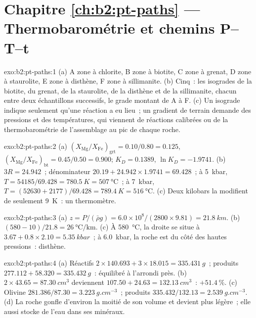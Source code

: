 \section*{Chapitre \ref{ch:b2:pt-paths} --- Thermobarométrie et chemins P--T--t}

\begin{solution}{exo:b2:pt-paths:1}
(a) A zone à chlorite, B zone à biotite, C zone à grenat, D zone à staurolite, E zone à disthène,
F zone à sillimanite. (b) Cinq~: les isogrades de la biotite, du grenat, de la staurolite, de la disthène et de la sillimanite,
chacun entre deux échantillons successifs, le grade montant de A à F. (c) Un isograde
indique seulement qu'une réaction a eu lieu~; un gradient de terrain demande des pressions et des températures, qui
viennent de réactions calibrées ou de la thermobarométrie de l'assemblage au pic de chaque
roche.
\end{solution}

\begin{solution}{exo:b2:pt-paths:2}
(a) $(X_{\text{Mg}}/X_{\text{Fe}})_{\text{grt}} = 0.10/0.80 = 0.125$,
$(X_{\text{Mg}}/X_{\text{Fe}})_{\text{bt}} = 0.45/0.50 = 0.900$; $K_D = 0.1389$, $\ln K_D =
-1.9741$. (b) $3R = 24.942$~; dénominateur $20.19 + 24.942\times1.9741 = 69.428$~; à
\qty{5}{kbar}, $T = 54185/69.428 = \qty{780.5}{K} = \qty{507}{\celsius}$~; à
\qty{7}{kbar}, $T = (52630 + 2177)/69.428 = \qty{789.4}{K} = \qty{516}{\celsius}$.
(c) Deux kilobars la modifient de seulement \qty{9}{K}~: un thermomètre.
\end{solution}

\begin{solution}{exo:b2:pt-paths:3}
(a) $z = P/(\bar\rho g) = 6.0\times10^8/(2800\times9.81) = \qty{21.8}{km}$.
(b) $(580 - 10)/21.8 = \qty{26}{\celsius\per\km}$. (c) À \qty{580}{\celsius}, la droite
se situe à $3.67 + 0.8\times2.10 = \qty{5.35}{kbar}$~; à \qty{6.0}{kbar}, la roche est du côté
des hautes pressions~: disthène.
\end{solution}

\begin{solution}{exo:b2:pt-paths:4}
(a) Réactifs $2\times140.693 + 3\times18.015 = \qty{335.431}{g}$~; produits $277.112 +
58.320 = \qty{335.432}{g}$~: équilibré à l'arrondi près. (b) $2\times43.65 =
\qty{87.30}{cm^3}$ deviennent $107.50 + 24.63 = \qty{132.13}{cm^3}$~: $+\qty{51.4}{\percent}$.
(c) Olivine $281.386/87.30 = \qty{3.223}{g.cm^{-3}}$~; produits $335.432/132.13 =
\qty{2.539}{g.cm^{-3}}$. (d) La roche gonfle d'environ la moitié de son volume et devient plus légère~; elle
aussi stocke de l'eau dans ses minéraux.
\end{solution}

